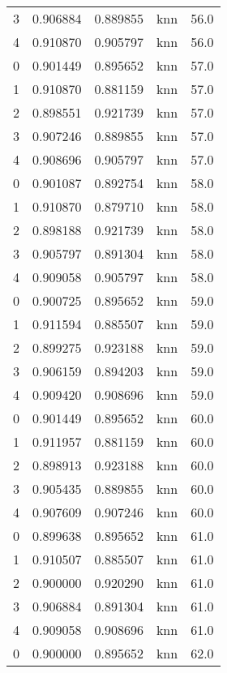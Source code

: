\begin{tabular}{rrrlr}
     3 & 0.906884 & 0.889855 &      knn &       56.0 \\
     4 & 0.910870 & 0.905797 &      knn &       56.0 \\
     0 & 0.901449 & 0.895652 &      knn &       57.0 \\
     1 & 0.910870 & 0.881159 &      knn &       57.0 \\
     2 & 0.898551 & 0.921739 &      knn &       57.0 \\
     3 & 0.907246 & 0.889855 &      knn &       57.0 \\
     4 & 0.908696 & 0.905797 &      knn &       57.0 \\
     0 & 0.901087 & 0.892754 &      knn &       58.0 \\
     1 & 0.910870 & 0.879710 &      knn &       58.0 \\
     2 & 0.898188 & 0.921739 &      knn &       58.0 \\
     3 & 0.905797 & 0.891304 &      knn &       58.0 \\
     4 & 0.909058 & 0.905797 &      knn &       58.0 \\
     0 & 0.900725 & 0.895652 &      knn &       59.0 \\
     1 & 0.911594 & 0.885507 &      knn &       59.0 \\
     2 & 0.899275 & 0.923188 &      knn &       59.0 \\
     3 & 0.906159 & 0.894203 &      knn &       59.0 \\
     4 & 0.909420 & 0.908696 &      knn &       59.0 \\
     0 & 0.901449 & 0.895652 &      knn &       60.0 \\
     1 & 0.911957 & 0.881159 &      knn &       60.0 \\
     2 & 0.898913 & 0.923188 &      knn &       60.0 \\
     3 & 0.905435 & 0.889855 &      knn &       60.0 \\
     4 & 0.907609 & 0.907246 &      knn &       60.0 \\
     0 & 0.899638 & 0.895652 &      knn &       61.0 \\
     1 & 0.910507 & 0.885507 &      knn &       61.0 \\
     2 & 0.900000 & 0.920290 &      knn &       61.0 \\
     3 & 0.906884 & 0.891304 &      knn &       61.0 \\
     4 & 0.909058 & 0.908696 &      knn &       61.0 \\
     0 & 0.900000 & 0.895652 &      knn &       62.0 \\

\end{tabular}
